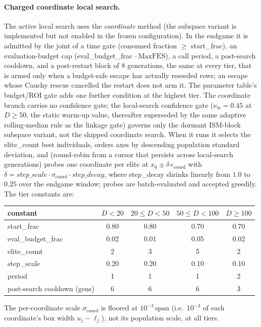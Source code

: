 \documentclass[10pt,a4paper]{article}
\begin{document}
\paragraph{Charged coordinate local search.}
The active local search uses the \emph{coordinate} method (the subspace variant is
implemented but not enabled in the frozen configuration).  In the endgame it is admitted
by the joint of a time gate (consumed fraction $\ge$ start\_frac), an
evaluation-budget cap (eval\_budget\_frac $\cdot\ \mathrm{MaxFES}$), a call period,
a post-search cooldown, and a post-restart block of $8$ generations, the same at
every tier, that is armed only when a budget-safe escape has actually reseeded
rows; an escape whose Cauchy rescue cancelled the restart does not arm it.
The parameter table's budget/ROI gate adds one further condition at the highest
tier.  The coordinate branch carries no confidence gate; the
local-search confidence gate ($\kappa_{\mathrm{ls}}=0.45$ at $D\ge 50$, the static
warm-up value, thereafter superseded by the same adaptive rolling-median rule
as the linkage gate) governs only the dormant ISM-block subspace variant, not
the shipped coordinate search.  When it runs
it selects the elite\_count best individuals, orders axes by descending
population standard deviation, and (round-robin from a cursor that persists across
local-search generations) probes one coordinate per elite at
$x_0 \pm \delta\,e_{\text{coord}}$ with
$\delta = step\_scale\cdot\sigma_{\text{coord}}\cdot step\_decay$, where
step\_decay shrinks linearly from $1.0$ to $0.25$ over the endgame window;
probes are batch-evaluated and accepted greedily.  The tier constants are:
\begin{center}
\small
\begin{tabular}{lcccc}
\toprule
constant & $D<20$ & $20\le D<50$ & $50\le D<100$ & $D\ge 100$\\
\midrule
start\_frac        & 0.80 & 0.80 & 0.70 & 0.70\\
eval\_budget\_frac & 0.02 & 0.01 & 0.05 & 0.02\\
elite\_count       & 2    & 3    & 5    & 2\\
step\_scale        & 0.20 & 0.20 & 0.10 & 0.10\\
period                      & 1    & 1    & 1    & 2\\
post-search cooldown (gens) & 6    & 6    & 6    & 3\\
\bottomrule
\end{tabular}
\end{center}
The per-coordinate scale $\sigma_{\text{coord}}$ is floored at $10^{-3}\,\mathrm{span}$ (i.e.\ $10^{-3}$ of each coordinate's box width $u_j-\ell_j$), not its population scale, at all tiers.
\end{document}

